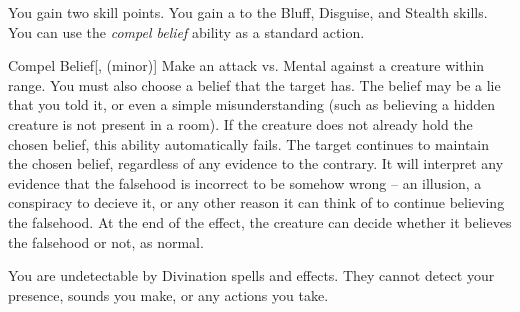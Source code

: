              You gain two skill points.
             You gain a   to the Bluff, Disguise, and Stealth skills.
             You can use the \textit{compel belief} ability as a standard action.
            \begin{apability}{Compel Belief}[,  (minor)]
                Make an attack vs. Mental against a creature within \rngmed range.
                You must also choose a belief that the target has.
                The belief may be a lie that you told it, or even a simple misunderstanding (such as believing a hidden creature is not present in a room).
                If the creature does not already hold the chosen belief, this ability automatically fails.
                \hit The target continues to maintain the chosen belief, regardless of any evidence to the contrary.
                It will interpret any evidence that the falsehood is incorrect to be somehow wrong -- an illusion, a conspiracy to decieve it, or any other reason it can think of to continue believing the falsehood.
                At the end of the effect, the creature can decide whether it believes the falsehood or not, as normal.
            \end{apability}
             You are undetectable by Divination spells and effects.
            They cannot detect your presence, sounds you make, or any actions you take.

